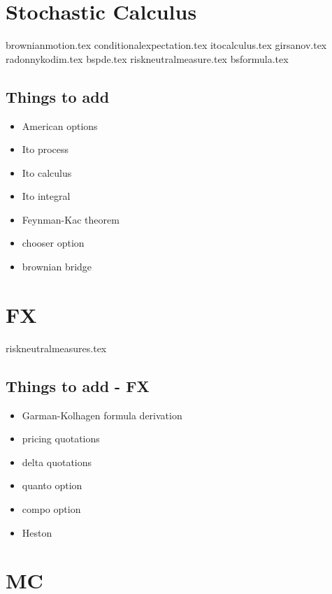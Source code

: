 \documentclass{report}
\begin{document}
\tableofcontents
	
\part{Stochastic Calculus}

{brownianmotion.tex}
{conditionalexpectation.tex}
{itocalculus.tex}
{girsanov.tex}
{radonnykodim.tex}
{bspde.tex}
{riskneutralmeasure.tex}
{bsformula.tex}


\chapter{Things to add}
\begin{itemize}
	\item American options
	\item Ito process
	\item Ito calculus
	\item Ito integral
	\item Feynman-Kac theorem
	\item chooser option
	\item brownian bridge
\end{itemize}


\part{FX}

{riskneutralmeasures.tex}

\chapter{Things to add - FX}
\begin{itemize}
	\item Garman-Kolhagen formula derivation
	\item pricing quotations
	\item delta quotations
	\item quanto option
	\item compo option
	\item Heston
\end{itemize}


\part{MC}
\end{document}
